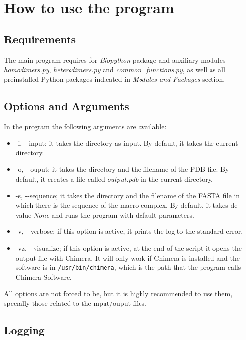 \documentclass[a4paper,10pt]{report}
\begin{document}
\chapter{How to use the program}

\section{Requirements}

The main program requires for \textit{Biopython} package and auxiliary modules \textit{homodimers.py}, \textit{heterodimers.py} and \textit{common\_functions.py}, as well as all preinstalled Python packages indicated in \textit{Modules and Packages} section.

\section{Options and Arguments}

In the program the following arguments are available:

\begin{itemize}
 \item -i, -{}-input; it takes the directory as input. By default, it takes the current directory.
 \item -o, -{}-ouput; it takes the directory and the filename of the PDB file. By default, it creates a file called \textit{output.pdb} in the current directory.
 \item -s, -{}-sequence; it takes the directory and the filename of the FASTA file in which there is the sequence of the macro-complex. By default, it takes de value \textit{None} and runs the program with default parameters.
 \item -v, -{}-verbose; if this option is active, it prints the log to the standard error. 
 \item -vz, -{}-visualize; if this option is active, at the end of the script it opens the output file with Chimera. It will only work if Chimera is installed and the software is in \texttt{/usr/bin/chimera}, which is the path that the program calls Chimera Software.
\end{itemize}

All options are not forced to be, but it is highly recommended to use them, specially those related to the input/ouput files.

\section{Logging}
\end{document}
